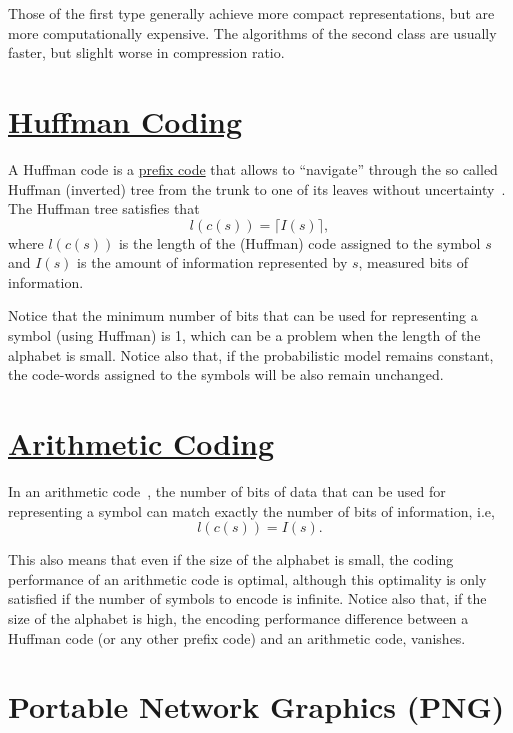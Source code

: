 Those of the first type generally achieve more compact
representations, but are more computationally expensive. The
algorithms of the second class are usually faster, but slighlt worse
in compression ratio.

\section{\href{https://en.wikipedia.org/wiki/Huffman_coding}{Huffman Coding}}

A Huffman code is a
\href{https://en.wikipedia.org/wiki/Prefix_code}{prefix code} that
allows to ``navigate'' through the so called Huffman (inverted) tree
from the trunk to one of its leaves without
uncertainty~\cite{vruiz__huffman_coding}. The Huffman tree satisfies that
\begin{equation}
  l(c(s)) = \lceil I(s)\rceil,
  \label{eq:huffman_performance}
\end{equation}
where $l(c(s))$ is the length of the (Huffman) code assigned to the
symbol $s$ and $I(s)$ is the amount of information represented by $s$,
measured bits of information.

Notice that the minimum number of bits that can be used for
representing a symbol (using Huffman) is 1, which can be a problem
when the length of the alphabet is small. Notice also that, if the
probabilistic model remains constant, the code-words assigned to the
symbols will be also remain unchanged.

\section{\href{https://en.wikipedia.org/wiki/Arithmetic_coding}{Arithmetic Coding}}

In an arithmetic code~\cite{vruiz__arithmetic_coding}, the number of
bits of data that can be used for representing a symbol can match
exactly the number of bits of information, i.e,
\begin{equation}
  l(c(s)) = I(s).
\end{equation}

This also means that even if the size of the alphabet is small, the
coding performance of an arithmetic code is optimal, although this
optimality is only satisfied if the number of symbols to encode is
infinite. Notice also that, if the size of the alphabet is high, the
encoding performance difference between a Huffman code (or any other
prefix code) and an arithmetic code, vanishes.

\section{Portable Network Graphics (PNG)}

